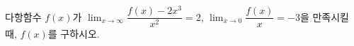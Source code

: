 다항함수 $f(x)$가 $\displaystyle\lim_{x\to\infty}\dfrac{f(x)-2x^3}{x^2}=2$, $\displaystyle\lim_{x\to 0}\dfrac{f(x)}{x}=-3$을 만족시킬 때, $f(x)$를 구하시오.
